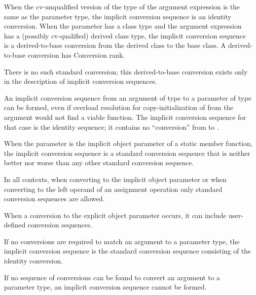 \pnum
When the cv-unqualified version of the type of the argument expression
is the same as the parameter type,
the implicit conversion sequence is an identity conversion.
When the parameter has a class type and the argument expression has a
(possibly cv-qualified)
derived class type, the implicit conversion sequence is a
derived-to-base
%
conversion from the derived class to the base class.
A derived-to-base conversion has Conversion rank.
\begin{note}
There is no such standard conversion; this derived-to-base conversion exists
only in the description of implicit conversion sequences.
\end{note}
\begin{example}
An implicit conversion sequence from an argument of type 
to a parameter of type  can be formed,
even if overload resolution for copy-initialization of 
from the argument would not find a viable function.
The implicit conversion sequence for that case is the identity sequence; it
contains no ``conversion'' from  to .
\end{example}

\pnum
When the parameter is the implicit object parameter of a static member function,
the implicit conversion sequence is a standard conversion sequence
that is neither better nor worse than any other standard conversion sequence.

\pnum
In all contexts, when converting to the implicit object parameter
or when converting to the left operand of an assignment operation
only standard conversion sequences are allowed.
\begin{note}
When a conversion to the explicit object parameter occurs,
it can include user-defined conversion sequences.
\end{note}

\pnum
If no conversions are required to match an argument to a
parameter type, the implicit conversion sequence is the standard
conversion sequence consisting of the identity conversion.

\pnum
If no sequence of conversions can be found to convert an argument
to a parameter type, an implicit conversion sequence cannot be formed.

